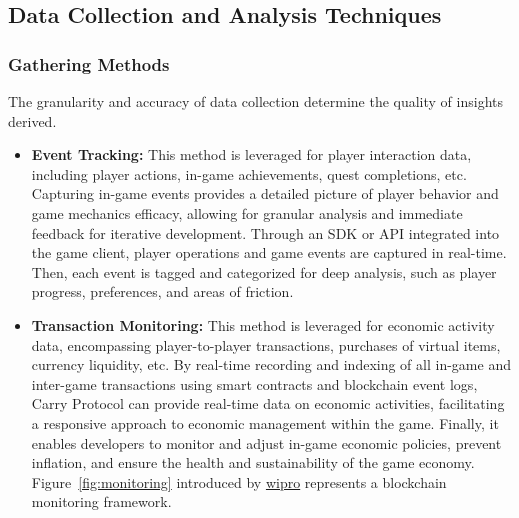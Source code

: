 \subsection{Data Collection and Analysis Techniques}
\subsubsection{Gathering Methods}
The granularity and accuracy of data collection determine the quality of insights derived. 
\begin{itemize}
    \item \textbf{Event Tracking:} This method is leveraged for player interaction data, including player actions, in-game achievements, quest completions, etc. Capturing in-game events provides a detailed picture of player behavior and game mechanics efficacy, allowing for granular analysis and immediate feedback for iterative development. Through an SDK or API integrated into the game client, player operations and game events are captured in real-time. Then, each event is tagged and categorized for deep analysis, such as player progress, preferences, and areas of friction.
\item \textbf{Transaction Monitoring:} This method is leveraged for economic activity data, encompassing player-to-player transactions, purchases of virtual items, currency liquidity, etc. By real-time recording and indexing of all in-game and inter-game transactions using smart contracts and blockchain event logs, Carry Protocol can provide real-time data on economic activities, facilitating a responsive approach to economic management within the game. Finally, it enables developers to monitor and adjust in-game economic policies, prevent inflation, and ensure the health and sustainability of the game economy. Figure~\ref{fig:monitoring} introduced by \href{https://www.wipro.com/blockchain/monitoring-and-management-of-blockchain-networks/}{wipro} represents a blockchain monitoring framework.


\end{itemize}
